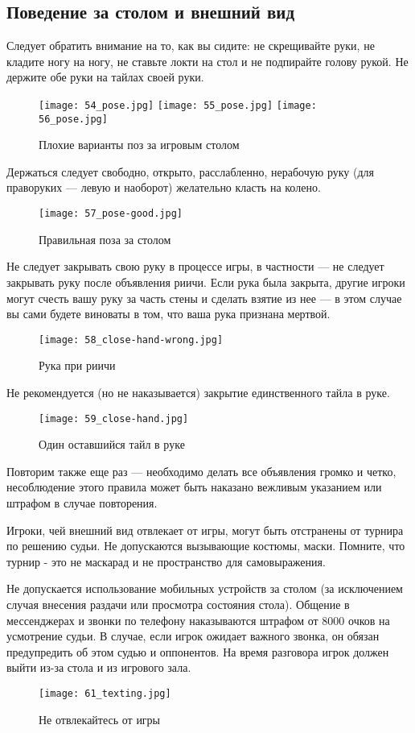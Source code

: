\subsection{Поведение за столом и внешний вид}

Следует обратить внимание на то, как вы сидите: не скрещивайте руки, не кладите ногу на ногу, не ставьте локти на стол и не подпирайте голову рукой. Не держите обе руки на тайлах своей руки.

\begin{figure}[H]
	\centering
	\texttt{[image: 54\_pose.jpg]}
	\texttt{[image: 55\_pose.jpg]}
	\texttt{[image: 56\_pose.jpg]}
	\caption{Плохие варианты поз за игровым столом}
\end{figure}

\newpage

Держаться следует свободно, открыто, расслабленно, нерабочую руку (для праворуких — левую и наоборот) желательно класть на колено.

\begin{figure}[H]
	\centering
	\texttt{[image: 57\_pose-good.jpg]}
	\caption{Правильная поза за столом}
\end{figure}

Не следует закрывать свою руку в процессе игры, в частности --- не следует закрывать руку после объявления риичи. Если рука была закрыта, другие игроки могут счесть вашу руку за часть стены и сделать взятие из нее --- в этом случае вы сами будете виноваты в том, что ваша рука признана мертвой.

\begin{figure}[H]
	\centering
	\texttt{[image: 58\_close-hand-wrong.jpg]}
	\caption{Рука при риичи}
\end{figure}

\newpage

Не рекомендуется (но не наказывается) закрытие единственного тайла в руке.

\begin{figure}[H]
	\centering
	\texttt{[image: 59\_close-hand.jpg]}
	\caption{Один оставшийся тайл в руке}
\end{figure}

Повторим также еще раз --- необходимо делать все объявления громко и четко, несоблюдение этого правила может быть наказано вежливым указанием или штрафом в случае повторения.

Игроки, чей внешний вид отвлекает от игры, могут быть отстранены от турнира по решению судьи. Не допускаются вызывающие костюмы, маски. Помните, что турнир - это не маскарад и не пространство для самовыражения.

Не допускается использование мобильных устройств за столом (за исключением случая внесения раздачи или просмотра состояния стола). Общение в мессенджерах и звонки по телефону наказываются штрафом от 8000 очков на усмотрение судьи. В случае, если игрок ожидает важного звонка, он обязан предупредить об этом судью и оппонентов. На время разговора игрок должен выйти из-за стола и из игрового зала.

\begin{figure}[H]
	\centering
	\texttt{[image: 61\_texting.jpg]}
	\caption{Не отвлекайтесь от игры}
\end{figure}